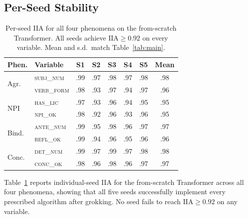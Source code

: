 \documentclass[11pt]{article}
\begin{document}
\subsection{Per-Seed Stability}
\label{app:per-seed}

\begin{table}[ht]
\centering\small
\setlength{\tabcolsep}{3.5pt}
\begin{tabular}{@{}llcccccc@{}}
\toprule
\textbf{Phen.} & \textbf{Variable} & \textbf{S1} & \textbf{S2} & \textbf{S3} & \textbf{S4} & \textbf{S5} & \textbf{Mean} \\
\midrule
\multirow{2}{*}{Agr.}
 & \textsc{subj\_num}  & .99 & .97 & .98 & .97 & .98 & .98 \\
 & \textsc{verb\_form} & .98 & .93 & .97 & .94 & .97 & .96 \\[2pt]
\multirow{2}{*}{NPI}
 & \textsc{has\_lic}   & .97 & .93 & .96 & .94 & .95 & .95 \\
 & \textsc{npi\_ok}    & .98 & .92 & .96 & .93 & .96 & .95 \\[2pt]
\multirow{2}{*}{Bind.}
 & \textsc{ante\_num}  & .99 & .95 & .98 & .96 & .97 & .97 \\
 & \textsc{refl\_ok}   & .99 & .94 & .96 & .95 & .96 & .96 \\[2pt]
\multirow{2}{*}{Conc.}
 & \textsc{det\_num}   & .99 & .97 & .99 & .97 & .98 & .98 \\
 & \textsc{conc\_ok}   & .98 & .96 & .98 & .96 & .97 & .97 \\
\bottomrule
\end{tabular}
\caption{Per-seed IIA for all four phenomena on the from-scratch Transformer. All seeds achieve $\mathrm{IIA} \geq 0.92$ on every variable. Mean and s.d.\ match Table~\ref{tab:main}.}
\label{tab:per-seed}
\end{table}

Table~\ref{tab:per-seed} reports individual-seed IIA for the from-scratch Transformer across all four phenomena, showing that all five seeds successfully implement every prescribed algorithm after grokking.
No seed fails to reach $\mathrm{IIA} \geq 0.92$ on any variable.
\end{document}
